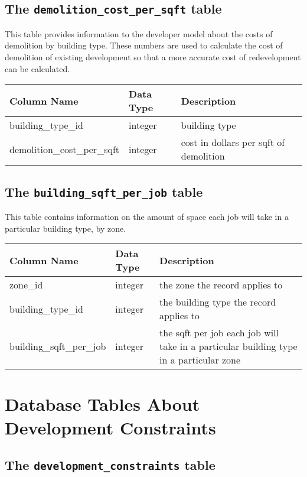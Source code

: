 \subsection{The {\tt demolition\_cost\_per\_sqft} table}
\label{sec:db-tables-demolition-cost-per-sqft}

This table provides information to the developer model about the costs of demolition by building type. These numbers are used to calculate the cost of demolition of existing development so that a more accurate cost of redevelopment can be calculated.

\begin{tabular}{p{2.3in}lp{3.2in}}
\textbf{Column Name} & \textbf{Data Type} & \textbf{Description} \\
\hline
building\_type\_id & integer & building type\\ \hline
demolition\_cost\_per\_sqft & integer & cost in dollars per sqft of demolition\\ \hline 
\end{tabular}


\subsection{The {\tt building\_sqft\_per\_job} table}
\label{sec:db-tables-building-sqft-per-job}

This table contains information on the amount of space each job will take in a particular building type, by zone.

\begin{tabular}{p{2.3in}lp{3.2in}}
\textbf{Column Name} & \textbf{Data Type} & \textbf{Description} \\
\hline
zone\_id & integer & the zone the record applies to\\ \hline
building\_type\_id & integer & the building type the record applies to\\ \hline
building\_sqft\_per\_job & integer & the sqft per job each job will take in a particular building type in a particular zone \\ \hline
\end{tabular}

\section{Database Tables About Development Constraints}

\subsection{The {\tt development_constraints} table}

